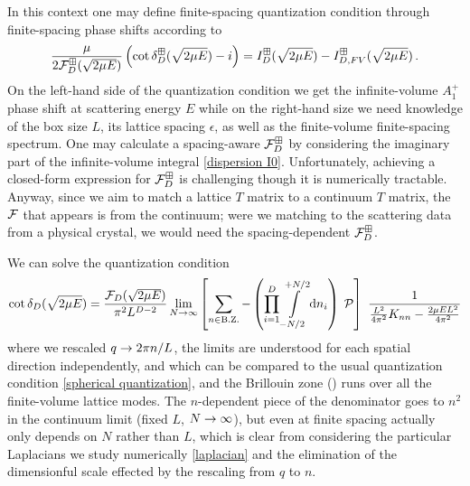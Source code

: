 In this context one may define finite-spacing quantization condition through finite-spacing phase shifts according to
\begin{equation}
    \frac{\mu}{2 \mathcal{F}_D^\boxplus(\sqrt{2\mu E})}\left(\cot\delta_D^\boxplus(\sqrt{2\mu E})-i\right)
    =
    I_D^{\boxplus}(\sqrt{2\mu E}) - I_{D,FV}^{\boxplus}(\sqrt{2\mu E})
	\, .
\end{equation}
On the left-hand side of the quantization condition we get the infinite-volume $A_1^+$ phase shift at scattering energy $E$ while on the right-hand size we need knowledge of the box size $L$, its lattice spacing $\epsilon$, as well as the finite-volume finite-spacing spectrum.
One may calculate a spacing-aware $\mathcal{F}_D^\boxplus$ by considering the imaginary part of the infinite-volume integral \eqref{dispersion I0}.
Unfortunately, achieving a closed-form expression for $\mathcal{F}_D^\boxplus$ is challenging though it is numerically tractable.
Anyway, since we aim to match a lattice $T$ matrix to a continuum $T$ matrix, the $\mathcal{F}$ that appears is from the continuum; were we matching to the scattering data from a physical crystal, we would need the spacing-dependent $\mathcal{F}_D^\boxplus$.

We can solve the quantization condition
\begin{align}
    \cot \delta_D(\sqrt{2 \mu E})
    =
    \frac{\mathcal{F}_D(\sqrt{2 \mu E})}{\pi^2 L^{D-2}}
    \lim_{N\rightarrow\infty}
    \left[
    	\sum_{n\in\text{B.Z.}} -
		\left(\prod_{i=1}^D
    		\int\limits_{-N/2}^{+N/2}
    		\mathrm{d} n_i
    	\right)\; \mathcal{P} 
	\right]\  \frac{1}{\frac{L^2}{4\pi^2} K_{nn}-\frac{2\mu E L^2}{4\pi^2}}
\end{align}
where we rescaled $q\rightarrow 2\pi n/L$, the limits are understood for each spatial direction independently, and which can be compared to the usual quantization condition \eqref{spherical quantization}, and the Brillouin zone (\BZ) runs over all the finite-volume lattice modes.
The $n$-dependent piece of the denominator goes to $n^2$ in the continuum limit (fixed $L$, $N\rightarrow\infty$), but even at finite spacing actually only depends on $N$ rather than $L$, which is clear from considering the particular Laplacians we study numerically \eqref{laplacian} and the elimination of the dimensionful scale effected by the rescaling from $q$ to $n$.

